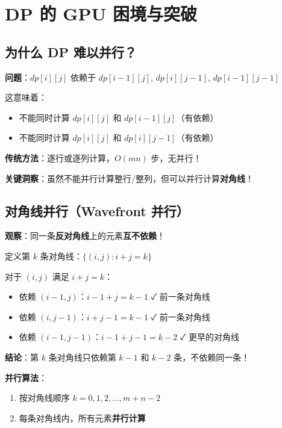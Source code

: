 \documentclass[12pt, a4paper]{ctexart}
\begin{document}
\section{DP 的 GPU 困境与突破}

\subsection{为什么 DP 难以并行？}

\begin{blackboard}[DP 的依赖结构]

\textbf{问题}：$dp[i][j]$ 依赖于 $dp[i-1][j]$, $dp[i][j-1]$, $dp[i-1][j-1]$

这意味着：
\begin{itemize}
    \item 不能同时计算 $dp[i][j]$ 和 $dp[i-1][j]$（有依赖）
    \item 不能同时计算 $dp[i][j]$ 和 $dp[i][j-1]$（有依赖）
\end{itemize}

\textbf{传统方法}：逐行或逐列计算，$O(mn)$ 步，无并行！

\textbf{关键洞察}：虽然不能并行计算整行/整列，但可以并行计算\textbf{对角线}！

\end{blackboard}

\subsection{对角线并行（Wavefront 并行）}

\begin{blackboard}

\textbf{观察}：同一条\textbf{反对角线}上的元素\textbf{互不依赖}！

定义第 $k$ 条对角线：$\{(i, j) : i + j = k\}$

对于 $(i, j)$ 满足 $i + j = k$：
\begin{itemize}
    \item 依赖 $(i-1, j)$：$i-1 + j = k - 1$ ✓ 前一条对角线
    \item 依赖 $(i, j-1)$：$i + j - 1 = k - 1$ ✓ 前一条对角线
    \item 依赖 $(i-1, j-1)$：$i-1+j-1 = k - 2$ ✓ 更早的对角线
\end{itemize}

\textbf{结论}：第 $k$ 条对角线只依赖第 $k-1$ 和 $k-2$ 条，不依赖同一条！

\textbf{并行算法}：
\begin{enumerate}
    \item 按对角线顺序 $k = 0, 1, 2, \ldots, m+n-2$
    \item 每条对角线内，所有元素\textbf{并行计算}
\end{enumerate}

\end{blackboard}
\end{document}

